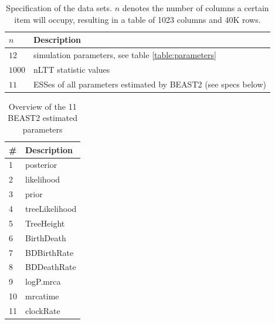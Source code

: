 \documentclass{article}
\begin{document}
\begin{table}
  \centering 
  \begin{tabular}{l l}
    \hline
    $n$ & Description \\
    \hline
    \hline
    $12$   & simulation parameters, see table \ref{table:parameters} \\
    $1000$ & nLTT statistic values \\
    $11$ & ESSes of all parameters estimated by BEAST2 (see specs below) \\
    \hline
  \end{tabular}
  \caption{
    Specification of the data sets. $n$ denotes the number
    of columns a certain item will occupy, resulting in a table of 
    1023 columns and 40K rows.
  }
  \label{table:specs}
\end{table}

\begin{table}
  \centering 
  \begin{tabular}{l l}
    \hline
    \# & Description \\
    \hline
    \hline
    1 & posterior \\
    2 & likelihood \\
    3 & prior \\
    4 & treeLikelihood \\
    5 & TreeHeight \\
    6 & BirthDeath \\
    7 & BDBirthRate \\
    8 & BDDeathRate \\
    9 & logP.mrca \\
    10 & mrcatime \\
    11 & clockRate \\
    \hline
  \end{tabular}
  \caption{
    Overview of the 11 BEAST2 estimated parameters
  }
  \label{table:estimated_parameters}
\end{table}
\end{document}
